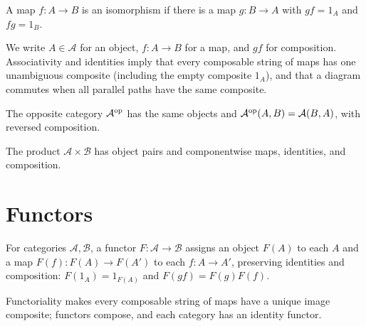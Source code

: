 \begin{definition}[Isomorphism]
\label{def:lbc-isomorphism}
A map $f:A\to B$ is an isomorphism if there is a map $g:B\to A$ with
$gf=1_A$ and $fg=1_B$.
\end{definition}

\begin{remark}
\label{rem:lbc-category-notation}
We write $A\in\mathcal A$ for an object, $f:A\to B$ for a map, and $gf$ for
composition. Associativity and identities imply that every composable string of
maps has one unambiguous composite (including the empty composite $1_A$), and
that a diagram commutes when all parallel paths have the same composite.
\end{remark}

\begin{definition}
\label{def:lbc-op-category}
The opposite category $\mathcal A^{\mathrm{op}}$ has the same objects and
$\mathcal A^{\mathrm{op}}(A,B)=\mathcal A(B,A)$, with reversed composition.
\end{definition}

\begin{definition}
\label{def:lbc-product-category}
The product $\mathcal A\times\mathcal B$ has object pairs and componentwise
maps, identities, and composition.
\end{definition}

\section{Functors}
\begin{definition}[Functor]
\label{def:lbc-functor}
For categories $\mathcal A,\mathcal B$, a functor $F:\mathcal A\to\mathcal B$
assigns an object $F(A)$ to each $A$ and a map $F(f):F(A)\to F(A')$ to each
$f:A\to A'$, preserving identities and composition:
$F(1_A)=1_{F(A)}$ and $F(gf)=F(g)F(f)$.
\end{definition}

\begin{remark}
\label{rem:lbc-functor-composites}
Functoriality makes every composable string of maps have a unique image
composite; functors compose, and each category has an identity functor.
\end{remark}

